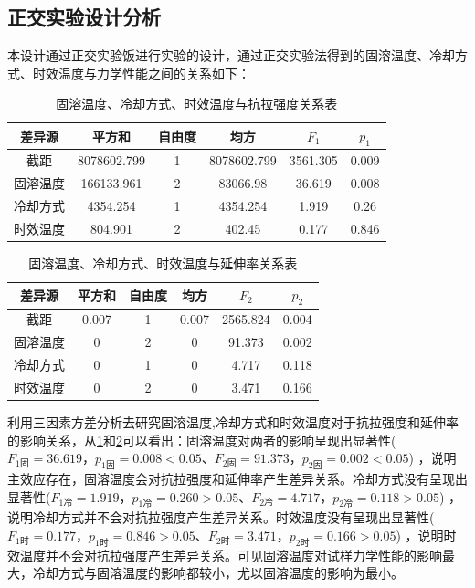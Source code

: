 \subsection{正交实验设计分析}
本设计通过正交实验饭进行实验的设计，通过正交实验法得到的固溶温度、冷却方式、时效温度与力学性能之间的关系如下：
\begin{table}[htbp]
	\centering
	\caption{固溶温度、冷却方式、时效温度与抗拉强度关系表}
	\label{sec:zjq}
	\begin{tabular}{cccccc}
		\toprule
		差异源 & 平方和 & 自由度 & 均方 & $ F_1 $ & $ p_1 $ \\
		\midrule
		截距 & 8078602.799 & 1 & 8078602.799 & 3561.305 & 0.009 \\
		固溶温度 & 166133.961 & 2 & 83066.98 & 36.619 & 0.008 \\
		冷却方式 & 4354.254 & 1 & 4354.254 & 1.919 & 0.26 \\
		时效温度 & 804.901 & 2 & 402.45 & 0.177 & 0.846 \\
		\bottomrule
	\end{tabular}
\end{table}
\begin{table}[htbp]
	\centering
	\caption{固溶温度、冷却方式、时效温度与延伸率关系表}
	\label{sec:zjy}
	\begin{tabular}{cccccc}
		\toprule
		差异源 & 平方和 & 自由度 & 均方 & $ F_2 $ & $ p_2 $ \\
		\midrule
		截距 & 0.007 & 1 & 0.007 & 2565.824 & 0.004 \\
		固溶温度 & 0 & 2 & 0 & 91.373 & 0.002 \\
		冷却方式 & 0 & 1 & 0 & 4.717 & 0.118 \\
		时效温度 & 0 & 2 & 0 & 3.471 & 0.166 \\
		\bottomrule
	\end{tabular}
\end{table}

利用三因素方差分析去研究固溶温度,冷却方式和时效温度对于抗拉强度和延伸率的影响关系，从\ref{sec:zjq}和\ref{sec:zjy}可以看出：固溶温度对两者的影响呈现出显著性($ F_{1固} =36.619，p_{1固}=0.008< 0.05 $、$ F_{2固} =91.373，p_{2固}=0.002< 0.05 $) ，说明主效应存在，固溶温度会对抗拉强度和延伸率产生差异关系。冷却方式没有呈现出显著性($ F_{1冷}=1.919，p_{1冷} =0.260>0.05 $、$ F_{2冷}=4.717，p_{2冷}=0.118>0.05 $) ，说明冷却方式并不会对抗拉强度产生差异关系。时效温度没有呈现出显著性($ F_{1时}=0.177，p_{1时}=0.846>0.05 $、$ F_{2时}=3.471，p_{2时} =0.166>0.05 $) ，说明时效温度并不会对抗拉强度产生差异关系。可见固溶温度对试样力学性能的影响最大，冷却方式与固溶温度的影响都较小，尤以固溶温度的影响为最小。

